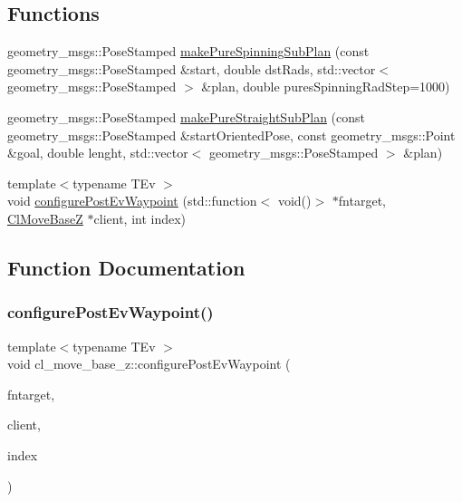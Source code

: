 \subsection*{Functions}
\begin{DoxyCompactItemize}
\item 
geometry\+\_\+msgs\+::\+Pose\+Stamped \hyperlink{namespacecl__move__base__z_ac774e138510eb7b5e0015be1f7709e19}{make\+Pure\+Spinning\+Sub\+Plan} (const geometry\+\_\+msgs\+::\+Pose\+Stamped \&start, double dst\+Rads, std\+::vector$<$ geometry\+\_\+msgs\+::\+Pose\+Stamped $>$ \&plan, double pures\+Spinning\+Rad\+Step=1000)
\item 
geometry\+\_\+msgs\+::\+Pose\+Stamped \hyperlink{namespacecl__move__base__z_a1d6998cc28a1847906272f2bf92bacc8}{make\+Pure\+Straight\+Sub\+Plan} (const geometry\+\_\+msgs\+::\+Pose\+Stamped \&start\+Oriented\+Pose, const geometry\+\_\+msgs\+::\+Point \&goal, double lenght, std\+::vector$<$ geometry\+\_\+msgs\+::\+Pose\+Stamped $>$ \&plan)
\item 
{\footnotesize template$<$typename T\+Ev $>$ }\\void \hyperlink{namespacecl__move__base__z_aee32c533c534df96361bb9622017e8e3}{configure\+Post\+Ev\+Waypoint} (std\+::function$<$ void()$>$ $\ast$fntarget, \hyperlink{classcl__move__base__z_1_1ClMoveBaseZ}{Cl\+Move\+BaseZ} $\ast$client, int index)
\end{DoxyCompactItemize}


\subsection{Function Documentation}
\mbox{\label{namespacecl__move__base__z_aee32c533c534df96361bb9622017e8e3}} 
\subsubsection{\texorpdfstring{configure\+Post\+Ev\+Waypoint()}{configurePostEvWaypoint()}}
{\footnotesize\ttfamily template$<$typename T\+Ev $>$ \\
void cl\+\_\+move\+\_\+base\+\_\+z\+::configure\+Post\+Ev\+Waypoint (\begin{DoxyParamCaption}\item[{std\+::function$<$ void()$>$ $\ast$}]{fntarget,  }\item[{\hyperlink{classcl__move__base__z_1_1ClMoveBaseZ}{Cl\+Move\+BaseZ} $\ast$}]{client,  }\item[{int}]{index }\end{DoxyParamCaption})}



